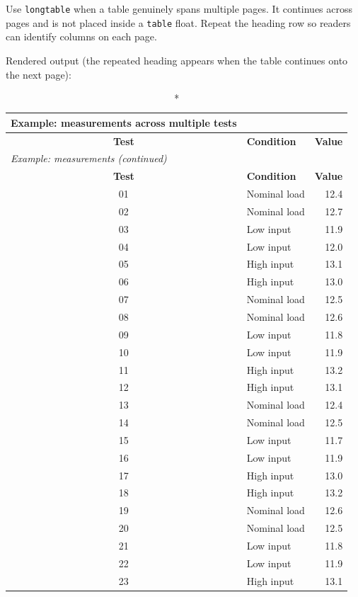 {

Use \verb|longtable| when a table genuinely spans multiple pages. It
continues across pages and is not placed inside a \verb|table| float.
Repeat the heading row so readers can identify columns on each page.

\RegExample Rendered output (the repeated heading appears when the
table continues onto the next page):

\begin{longtable}{|c|l|r|}
\caption*{Example: measurements across multiple tests}\\
\hline
\textbf{Test} & \textbf{Condition} & \textbf{Value} \\
\hline
\endfirsthead
\multicolumn{3}{l}{\textit{Example: measurements (continued)}}\\
\hline
\textbf{Test} & \textbf{Condition} & \textbf{Value} \\
\hline
\endhead
01 & Nominal load & 12.4 \\\hline
02 & Nominal load & 12.7 \\\hline
03 & Low input & 11.9 \\\hline
04 & Low input & 12.0 \\\hline
05 & High input & 13.1 \\\hline
06 & High input & 13.0 \\\hline
07 & Nominal load & 12.5 \\\hline
08 & Nominal load & 12.6 \\\hline
09 & Low input & 11.8 \\\hline
10 & Low input & 11.9 \\\hline
11 & High input & 13.2 \\\hline
12 & High input & 13.1 \\\hline
13 & Nominal load & 12.4 \\\hline
14 & Nominal load & 12.5 \\\hline
15 & Low input & 11.7 \\\hline
16 & Low input & 11.9 \\\hline
17 & High input & 13.0 \\\hline
18 & High input & 13.2 \\\hline
19 & Nominal load & 12.6 \\\hline
20 & Nominal load & 12.5 \\\hline
21 & Low input & 11.8 \\\hline
22 & Low input & 11.9 \\\hline
23 & High input & 13.1 \\\hline

\end{longtable}}
